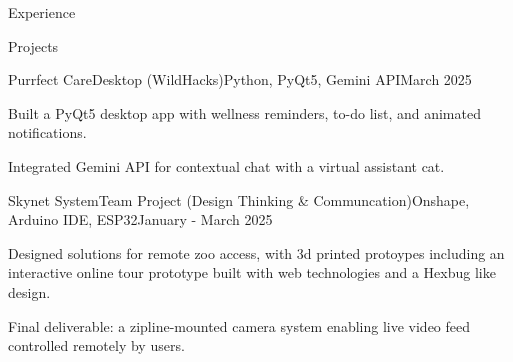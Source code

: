 \documentclass[
    a4paper,
    9pt,
]{resume}
\begin{document}
\begin{rSection}{Experience}
%		
	
\end{rSection}


\begin{rSection}{Projects}

	\begin{rSubsection}{Purrfect Care}{Desktop (WildHacks)}{Python, PyQt5, Gemini API}{March 2025}{}
		\item Built a PyQt5 desktop app with wellness reminders, to-do list, and animated notifications.
  		\item Integrated Gemini API for contextual chat with a virtual assistant cat.
	  \end{rSubsection}



\begin{rSubsection}{Skynet System}{Team Project (Design Thinking \& Communcation)}{Onshape, Arduino IDE, ESP32}{January - March 2025}
	  \item Designed solutions for remote zoo access, with 3d printed protoypes including an interactive online tour prototype built with web technologies and a Hexbug like design.
  	\item Final deliverable: a zipline-mounted camera system enabling live video feed controlled remotely by users.
    \end{rSubsection}
    
  \end{rSection}

%
\end{document}

